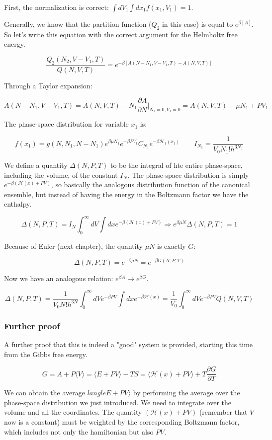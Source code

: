 	First, the normalization is correct: $\int dV_1\int dx_1f(x_1, V_1) = 1$.

	Generally, we know that the partition function ($Q_2$ in this case) is equal to $e^{\beta[A]}$. So let's write this equation with the correct argument for the Helmholtz free energy.

	$$\frac{Q_2(N_2, V-V_1, T)}{Q(N, V, T)} = e^{-\beta[A(N-N_1, V-V_1, T) - A(N, V, T)]}$$

Through a Taylor expansion:

	$$A(N-N_1, V-V_1, T) = A(N, V, T)-N_1\frac{\partial A}{\partial N}|_{N_1 = 0, V_1 = 0} = A(N, V, T)-\mu N_1 + PV_1$$

	The phase-space distribution for variable $x_1$ is:

	$$f(x_1) = g(N, N_1, N-N_1) e^{\beta\mu N_1}e^{-\beta P V_1}C_{N_1}e^{-\beta\mathcal{H}_1(x_1)}\qquad I_{N_1} = \frac{1}{V_0N_1!h^{3N_1}}$$

	We define a quantity $\Delta(N, P, T)$ to be the integral of hte entire phase-space, including the volume, of the constant $I_N$. The phase-space distribution is simply $e^{-\beta(\mathcal{H}(x) + PV)}$, so basically the analogous distribution function of the canonical ensemble, but instead of having the energy in the Boltzmann factor we have the enthalpy.

	$$\Delta(N, P, T) = I_N\int_0^{\infty}dV\int dxe^{-\beta(\mathcal{H}(x) + PV)}\Rightarrow e^{\beta\mu N}\Delta(N, P, T) = 1$$

	Because of Euler (next chapter), the quantity $\mu N$ is exactly $G$:

	$$\Delta(N, P, T) = e^{-\beta\mu N} = e^{-\beta G(N, P, T)}$$

	Now we have an analogous relation: $e^{\beta A} \rightarrow e^{\beta G}$.

	$$\Delta(N, P, T) = \frac{1}{V_0N!h^{3N}}\int_0^{\infty}dVe^{-\beta PV}\int dxe^{-\beta\mathcal{H}(x)} = \frac{1}{V_0}\int_0^{\infty}dVe^{-\beta PV}Q(N, V, T)$$

	\subsubsection{Further proof}
	A further proof that this is indeed a "good" system is provided, starting this time from the Gibbs free energy.

	$$G = A + P\langle V \rangle = \langle E + PV\rangle - TS = \langle\mathcal{H}(x) + PV\rangle + T\frac{\partial G}{\partial T}$$

We can obtain the average $langle E + PV\rangle$ by performing the average over the phase-space distribution we just introduced. We need to integrate over the volume and all the coordinates. The quantity $(\mathcal{H}(x) + PV)$ (remember that $V$ now is a constant) must be weighted by the corresponding Boltzmann factor, which includes not only the hamiltonian but also $PV$.

